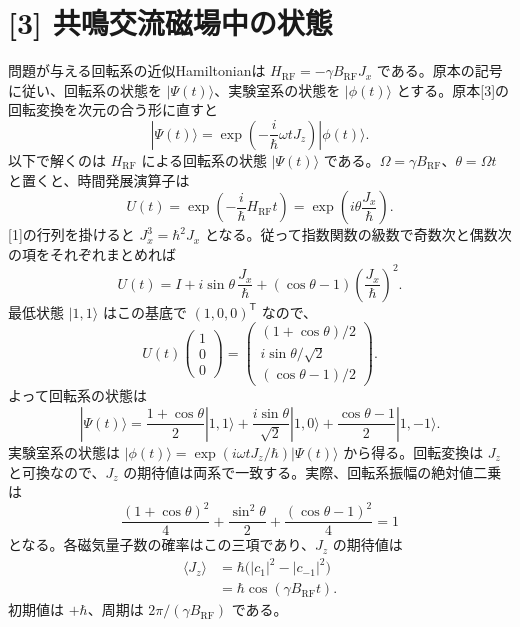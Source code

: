 \documentclass[11pt,a4paper]{article}
\begin{document}
\section*{[3] 共鳴交流磁場中の状態}
問題が与える回転系の近似Hamiltonianは $H_{\mathrm{RF}}=-\gamma B_{\mathrm{RF}}J_x$ である。原本の記号に従い、回転系の状態を $|\Psi(t)\rangle$、実験室系の状態を $|\phi(t)\rangle$ とする。原本[3]の回転変換を次元の合う形に直すと
\begin{equation}
  |\Psi(t)\rangle=\exp\!\left(-\frac{i}{\hbar}\omega tJ_z\right)|\phi(t)\rangle.
\end{equation}
以下で解くのは $H_{\mathrm{RF}}$ による回転系の状態 $|\Psi(t)\rangle$ である。$\Omega=\gamma B_{\mathrm{RF}}$、$\theta=\Omega t$ と置くと、時間発展演算子は
\begin{equation}
  U(t)=\exp\!\left(-\frac{i}{\hbar}H_{\mathrm{RF}}t\right)
  =\exp\!\left(i\theta\frac{J_x}{\hbar}\right).
\end{equation}
[1]の行列を掛けると $J_x^3=\hbar^2J_x$ となる。従って指数関数の級数で奇数次と偶数次の項をそれぞれまとめれば
\begin{equation}
  U(t)=I+i\sin\theta\,\frac{J_x}{\hbar}
       +(\cos\theta-1)\left(\frac{J_x}{\hbar}\right)^2.
\end{equation}
最低状態 $|1,1\rangle$ はこの基底で $(1,0,0)^{\mathsf T}$ なので、
\begin{equation}
  U(t)\begin{pmatrix}1\\0\\0\end{pmatrix}
  =\begin{pmatrix}
      (1+\cos\theta)/2\\
      i\sin\theta/\sqrt{2}\\
      (\cos\theta-1)/2
    \end{pmatrix}.
\end{equation}
よって回転系の状態は
\begin{equation}
  \boxed{|\Psi(t)\rangle=
    \frac{1+\cos\theta}{2}|1,1\rangle
    +\frac{i\sin\theta}{\sqrt{2}}|1,0\rangle
    +\frac{\cos\theta-1}{2}|1,-1\rangle.}
\end{equation}
実験室系の状態は $|\phi(t)\rangle=\exp(i\omega tJ_z/\hbar)|\Psi(t)\rangle$ から得る。回転変換は $J_z$ と可換なので、$J_z$ の期待値は両系で一致する。実際、回転系振幅の絶対値二乗は
\begin{equation}
  \frac{(1+\cos\theta)^2}{4}+\frac{\sin^2\theta}{2}
  +\frac{(\cos\theta-1)^2}{4}=1
\end{equation}
となる。各磁気量子数の確率はこの三項であり、$J_z$ の期待値は
\begin{align}
  \langle J_z\rangle
  &=\hbar\bigl(|c_1|^2-|c_{-1}|^2\bigr)\\
  &=\boxed{\hbar\cos(\gamma B_{\mathrm{RF}}t)}.
\end{align}
初期値は $+\hbar$、周期は $2\pi/(\gamma B_{\mathrm{RF}})$ である。
\end{document}
